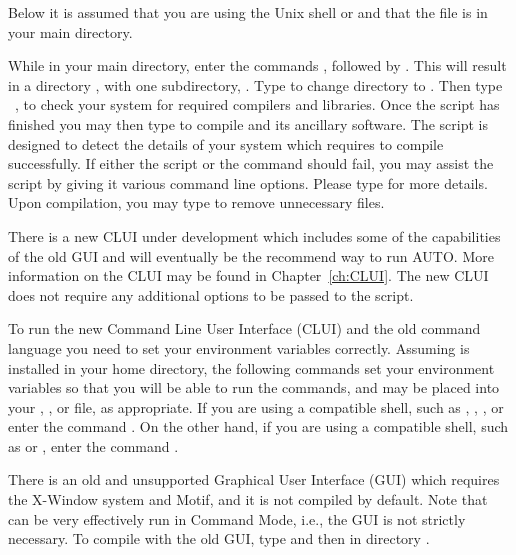 Below it is assumed that you are using the Unix shell  or
and that the file  is in your main directory.

While in your main directory, enter the commands
,
followed by
.
This will result in a directory , 
with one subdirectory, . 
Type   
to change directory to .
Then type 
~,
to check your system for required compilers and libraries.
Once the  script has finished you 
may then type  to compile \AUTO
and its ancillary software.
The  script is designed to detect the details
of your system which \AUTO requires to compile successfully.
If either the  script or the  command
should fail, you may assist the  script by giving
it various command line options.  Please type 
for more details.
Upon compilation, you may type 
to remove unnecessary files.

There is a new CLUI under development
which includes some of the capabilities of the old GUI and will
eventually be the recommend way to run AUTO.  More information on the
CLUI may be found in Chapter~\ref{ch:CLUI}.  The new CLUI does not
require any additional options to be passed to the 
script.

To run the new Command Line User Interface (CLUI) and the old command
language you need to set your environment variables correctly.
Assuming \AUTO is installed in your home directory, the following
commands set your environment variables so that you will be able to
run the \AUTO commands, and may be placed into your ,
, or  file, as appropriate.  If you are
using a  compatible shell, such as ,
, , or  enter the command
.  On the
other hand, if you are using a  compatible shell, such
as  or , enter the command .

There is an old and unsupported Graphical User Interface (GUI)
which requires the {\cal X-Window} system and {\cal Motif}, and it is not
compiled by default.  Note that \AUTO can be very effectively run in
Command Mode, i.e., the GUI is not strictly necessary.  To compile
\AUTO with the old GUI, type  and then
 in directory .  

